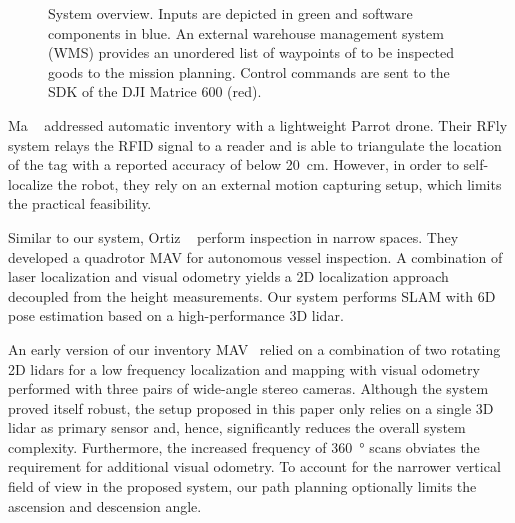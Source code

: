 \begin{figure}[t]
  \centering
  
  \vspace{-0.5em}
  \caption{System overview. Inputs are depicted in green and software components in blue. An external warehouse management system (WMS) provides an unordered list of waypoints of to be inspected goods to the mission planning. Control commands are sent to the SDK of the DJI Matrice 600 (red).}
  \label{fig:system_diagram}
  \vspace{-3ex}
\end{figure}

Ma \etal~\cite{ma2017drone} addressed automatic inventory with a lightweight Parrot drone.
Their RFly system relays the RFID signal to a reader and is able to triangulate the location of the tag with a reported accuracy of below \SI{20}{\centi\meter}.
However, in order to self-localize the robot, they rely on an external motion capturing setup, which limits the practical feasibility.

Similar to our system, Ortiz \etal~\cite{ortiz2014} perform inspection in narrow spaces.
They developed a quadrotor MAV for autonomous vessel inspection.
A combination of laser localization and visual odometry yields a 2D localization approach decoupled from the height measurements.
Our system performs SLAM with 6D pose estimation based on a high-performance 3D lidar.

An early version of our inventory MAV~\cite{ROS_book_2017} relied on a combination of two rotating 2D lidars for a low frequency localization and mapping with visual odometry performed with three pairs of wide-angle stereo cameras.
Although the system proved itself robust, the setup proposed in this paper only relies on a single 3D lidar as primary sensor and, hence, significantly reduces the overall system complexity.
Furthermore, the increased frequency of \SI{360}{\degree} scans obviates the requirement for additional visual odometry.
To account for the narrower vertical field of view in the proposed system, our path planning optionally limits the ascension and descension angle.
